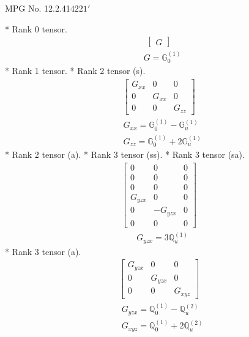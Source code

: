 \documentclass[fleqn,8pt,landscape]{jsarticle}
\begin{document}
\setcounter{MaxMatrixCols}{32}

\renewcommand{\tablename}{Table~}
\renewcommand{\figurename}{Figure~}
\begin{center}
\LARGE
MPG No. 12.2.41\quad$4221'$
\end{center}
* Rank 0 tensor.
\begin{align*}
\begin{bmatrix} G \end{bmatrix}
\end{align*}
\begin{align*}
& G = \mathbb{G}_{0}^{(1)}
\end{align*}
* Rank 1 tensor.
* Rank 2 tensor (s).
\begin{align*}
\begin{bmatrix} G_{xx} & 0 & 0 \\ 0 & G_{xx} & 0 \\ 0 & 0 & G_{zz} \end{bmatrix}
\end{align*}
\begin{align*}
& G_{xx} = \mathbb{G}_{0}^{(1)} - \mathbb{G}_{u}^{(1)} \\
& G_{zz} = \mathbb{G}_{0}^{(1)} + 2 \mathbb{G}_{u}^{(1)}
\end{align*}
* Rank 2 tensor (a).
* Rank 3 tensor (ss).
* Rank 3 tensor (sa).
\begin{align*}
\begin{bmatrix} 0 & 0 & 0 \\ 0 & 0 & 0 \\ 0 & 0 & 0 \\ G_{yzx} & 0 & 0 \\ 0 & - G_{yzx} & 0 \\ 0 & 0 & 0 \end{bmatrix}
\end{align*}
\begin{align*}
& G_{yzx} = 3 \mathbb{Q}_{u}^{(1)}
\end{align*}
* Rank 3 tensor (a).
\begin{align*}
\begin{bmatrix} G_{yzx} & 0 & 0 \\ 0 & G_{yzx} & 0 \\ 0 & 0 & G_{xyz} \end{bmatrix}
\end{align*}
\begin{align*}
& G_{yzx} = \mathbb{Q}_{0}^{(1)} - \mathbb{Q}_{u}^{(2)} \\
& G_{xyz} = \mathbb{Q}_{0}^{(1)} + 2 \mathbb{Q}_{u}^{(2)}
\end{align*}
\end{document}
